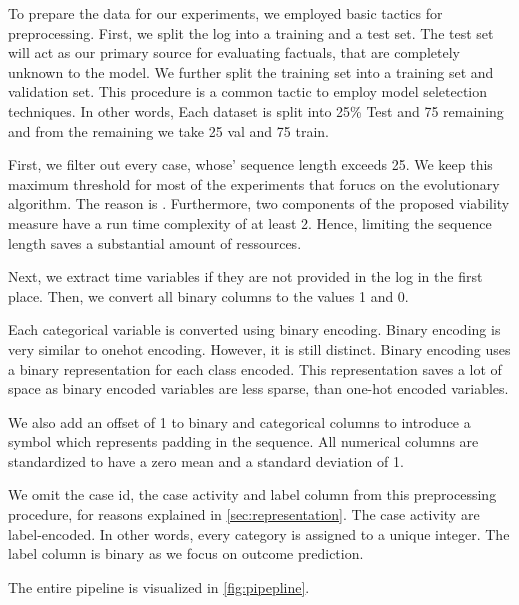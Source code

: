 \documentclass[./../../paper.tex]{subfiles}
\begin{document}
To prepare the data for our experiments, we employed basic tactics for preprocessing. First, we split the log into a training and a test set. The test set will act as our primary source for evaluating factuals, that are completely unknown to the model. We further split the training set into a training set and validation set. This procedure is a common tactic to employ model seletection techniques.  In other words, Each dataset is split into 25\% Test and 75 remaining and from the remaining we take 25 val and 75 train.

First, we filter out every case, whose' sequence length exceeds 25.  We keep this maximum threshold for most of the experiments that forucs on the evolutionary algorithm. The reason is . Furthermore, two components of the proposed viability measure have a run time complexity of at least 2. Hence, limiting the sequence length saves a substantial amount of ressources.

Next, we extract time variables if they are not provided in the log in the first place. Then, we convert all binary columns to the values 1 and 0. 

Each categorical variable is converted using binary encoding. Binary encoding is very similar to onehot encoding. However, it is still distinct. Binary encoding uses a binary representation for each class encoded. This representation saves a lot of space as binary encoded variables are less sparse, than one-hot encoded variables.  

We also add an offset of 1 to binary and categorical columns to introduce a symbol which represents padding in the sequence. All numerical columns are standardized to have a zero mean and a standard deviation of 1.

We omit the case id, the case activity and label column from this preprocessing procedure, for reasons explained in \autoref{sec:representation}. The case activity are label-encoded. In other words, every category is assigned to a unique integer. The label column is binary as we focus on outcome prediction.

The entire pipeline is visualized in \autoref{fig:pipepline}.

\end{document}
